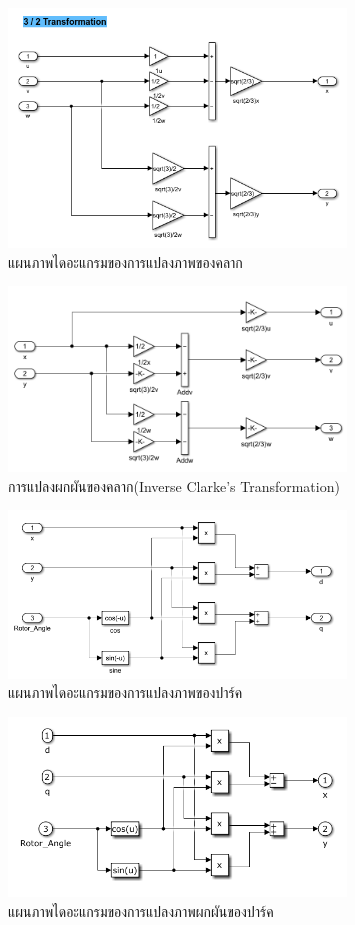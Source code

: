 \documentclass[11pt,a4paper]{article}
\begin{document}
\begin{figure}[H]
    \centering
    \includegraphics[width=0.8\textwidth]{clarke_trans.png}
    \caption{แผนภาพไดอะแกรมของการแปลงภาพของคลาก}
\end{figure}
\begin{figure}[H]
    \centering
    \includegraphics[width=0.8\textwidth]{inverse_clarke.png}
    \caption{การแปลงผกผันของคลาก(Inverse Clarke's Transformation)}
\end{figure}
\begin{figure}[H]
    \centering
    \includegraphics[width=0.8\textwidth]{park_trans.png}
    \caption{แผนภาพไดอะแกรมของการแปลงภาพของปาร์ค}
\end{figure}
\begin{figure}[H]
    \centering
    \includegraphics[width=0.8\textwidth]{park_inverse_trans.png}
    \caption{แผนภาพไดอะแกรมของการแปลงภาพผกผันของปาร์ค}
\end{figure}
\end{document}
